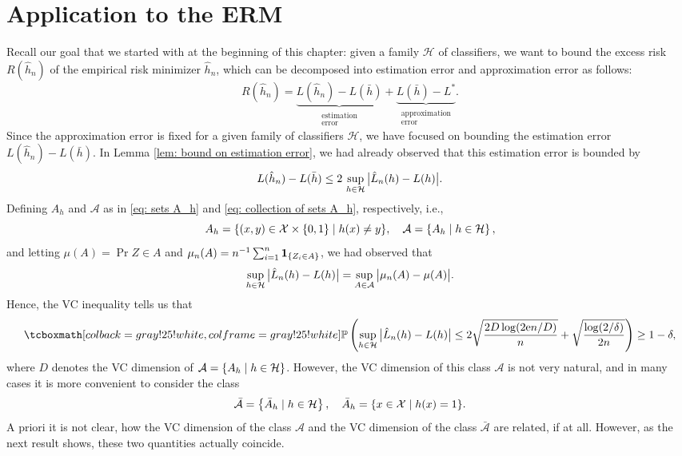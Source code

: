 \section{Application to the ERM}

Recall our goal that we started with at the beginning of this chapter: given a family $\mathcal{H}$ of classifiers, we want to bound the excess risk $R(\hat h_n)$ of the empirical risk minimizer $\hat h_n$, which can be decomposed into estimation error and approximation error as follows:
\[
    R(\hat h_n) = \underbrace{L(\hat h_n) - L(\bar h)}_{\substack{\text{estimation} \\ \text{error}}} + \underbrace{L(\bar h) - L^*}_{\substack{\text{approximation} \\ \text{error}}}.
\]
Since the approximation error is fixed for a given family of classifiers $\mathcal{H}$, we have focused on bounding the estimation error $L(\hat h_n) - L(\bar h)$. In Lemma \ref{lem: bound on estimation error}, we had already observed that this estimation error is bounded by
\[
    L(\hat h_n) - L(\bar h) \leq 2 \, \sup_{h \in \mathcal{H}} \big\lvert \hat L_n(h) - L(h) \big\rvert.
\]
Defining $A_h$ and $\mathcal{A}$ as in \eqref{eq: sets A_h} and \eqref{eq: collection of sets A_h}, respectively, i.e.,
\[
    A_h = \{ (x, y) \in \mathcal{X} \times \left\{0, 1\right\} \mathrel{|} h(x) \neq y \}, \quad \mathcal{A} = \left\{A_h \mathrel{|} h \in \mathcal{H}\right\},
\]
and letting $\mu(A) = \Pr{Z \in A}$ and $\mu_n(A) = n^{-1} \sum_{i=1}^n \mathbf{1}_{\left\{Z_i \in A\right\}}$, we had observed that
\[
    \sup_{h \in \mathcal{H}} \big\lvert \hat L_n(h) - L(h) \big\rvert = \sup_{A \in \mathcal{A}} \big\lvert \mu_n(A) - \mu(A) \big\rvert.
\]
Hence, the VC inequality tells us that
\begin{equation}
\label{eq: VC ineqaulity for ERM}
    \highlightMath{
        \Pr{ \sup_{h \in \mathcal{H}} \bigAbs{ \hat L_n(h) - L(h) } \leq 2 \sqrt{\frac{2D \log(2 \e n / D)}{n}} + \sqrt{\frac{\log(2 / \delta)}{2n}} } \geq 1 - \delta,
    }
\end{equation}
where $D$ denotes the VC dimension of $\mathcal{A} = \left\{A_h \mathrel{|} h \in \mathcal{H}\right\}$. However, the VC dimension of this class $\mathcal{A}$ is not very natural, and in many cases it is more convenient to consider the class
\begin{equation}
\label{eq: collection of sets bar A_h}
    \bar{\mathcal{A}} = \left\{\bar A_h \mathrel{|} h \in \mathcal{H}\right\}, \quad \bar A_h = \{ x \in \mathcal{X} \mathrel{|} h(x) = 1 \}.
\end{equation}
A priori it is not clear, how the VC dimension of the class $\mathcal{A}$ and the VC dimension of the class $\bar{\mathcal{A}}$ are related, if at all. However, as the next result shows, these two quantities actually coincide.

